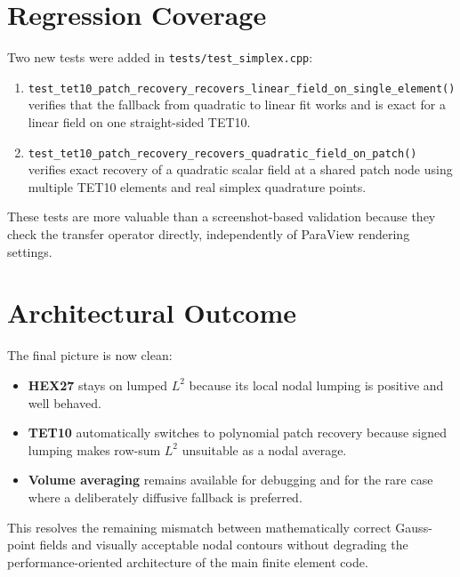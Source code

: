 \section{Regression Coverage}
\label{sec:patch_tests}

Two new tests were added in \texttt{tests/test\_simplex.cpp}:
\begin{enumerate}[nosep]
  \item \texttt{test\_tet10\_patch\_recovery\_recovers\_linear\_field\_on\_single\_element()}
        verifies that the fallback from quadratic to linear fit works and is
        exact for a linear field on one straight-sided TET10.
  \item \texttt{test\_tet10\_patch\_recovery\_recovers\_quadratic\_field\_on\_patch()}
        verifies exact recovery of a quadratic scalar field at a shared patch
        node using multiple TET10 elements and real simplex quadrature points.
\end{enumerate}

These tests are more valuable than a screenshot-based validation because they
check the transfer operator directly, independently of ParaView rendering
settings.


\section{Architectural Outcome}
\label{sec:patch_outcome}

The final picture is now clean:
\begin{itemize}[nosep]
  \item \textbf{HEX27} stays on lumped $L^2$ because its local nodal lumping is
        positive and well behaved.
  \item \textbf{TET10} automatically switches to polynomial patch recovery
        because signed lumping makes row-sum $L^2$ unsuitable as a nodal
        average.
  \item \textbf{Volume averaging} remains available for debugging and for the
        rare case where a deliberately diffusive fallback is preferred.
\end{itemize}

This resolves the remaining mismatch between mathematically correct Gauss-point
fields and visually acceptable nodal contours without degrading the
performance-oriented architecture of the main finite element code.
